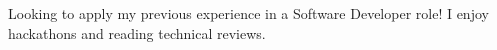 

\begin{cvparagraph}
Looking to apply my previous experience in a Software Developer role! I enjoy hackathons and reading technical reviews.
\end{cvparagraph}
